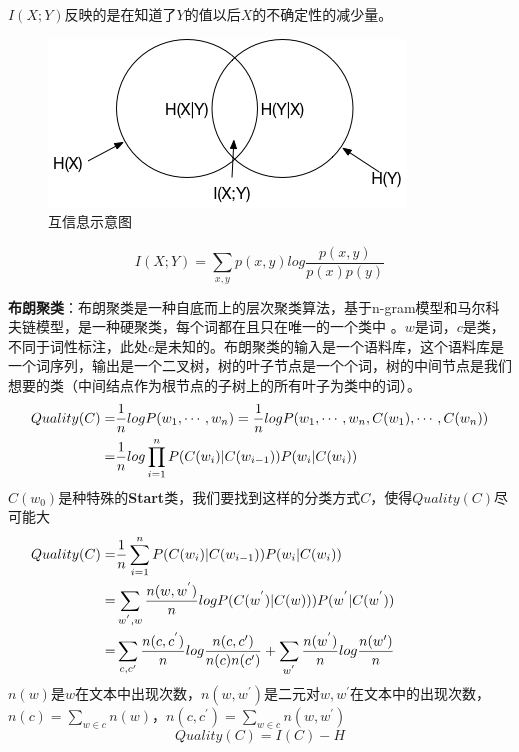\documentclass[12pt,a4paper]{article}
\begin{document}
$I(X;Y)$反映的是在知道了$Y$的值以后$X$的不确定性的减少量。
\begin{figure}
  \centering
  \includegraphics[width=0.5\linewidth]{./figures/mutualInfo.png}
  \caption{互信息示意图}\label{fig:muinfo}
\end{figure}

\begin{equation}
I(X;Y) = \sum_{x,y} p(x,y) log \frac{p(x,y)}{p(x)p(y)}
\end{equation}

\textbf{布朗聚类}：布朗聚类是一种自底而上的层次聚类算法，基于n-gram模型和马尔科夫链模型，是一种硬聚类，每个词都在且只在唯一的一个类中 \cite{derczynski2015tune,DBLP:conf/aaai/DerczynskiC16}。$w$是词，$c$是类，不同于词性标注，此处$c$是未知的。布朗聚类的输入是一个语料库，这个语料库是一个词序列，输出是一个二叉树，树的叶子节点是一个个词，树的中间节点是我们想要的类（中间结点作为根节点的子树上的所有叶子为类中的词）。
\begin{equation}
\begin{split}
Quality(C)=&\frac{1}{n}logP(w_1,\cdots,w_n) =\frac{1}{n}logP(w_1,\cdots,w_n,C(w_1),\cdots,C(w_n))\\
=&\frac{1}{n}log\prod_{i=1}^{n}P(C(w_i)|C(w_{i-1}))P(w_i|C(w_i))\hspace{1.8cm}
\end{split}
\end{equation}
$C(w_0)$是种特殊的\textbf{Start}类，我们要找到这样的分类方式$C$，使得$Quality(C)$尽可能大
\begin{equation}
\begin{split}
Quality(C)=&\frac{1}{n}\sum_{i=1}^{n}P(C(w_i)|C(w_{i-1}))P(w_i|C(w_i))\hspace{3.7cm}\\
=&\sum_{w^{'},w}\frac{n(w,w^{'})}{n}logP(C(w^{'})|C(w)))P(w^{'}|C(w^{'}))\\
=&\sum_{c,c{'}}\frac{n(c,c^{'})}{n}log\frac{n(c,c{'})}{n(c)n(c')}+\sum_{w^{'}} \frac {n(w^{'})}{n}log\frac{n(w')}{n}
\end{split}
\end{equation}
$n(w)$是$w$在文本中出现次数，$n(w,w^{'})$是二元对$w,w^{'}$在文本中的出现次数，$n(c)=\sum_{w\in c}n(w)$，$n(c,c^{'})=\sum_{w\in c}n(w,w^{'})$		
\begin{equation}
  Quality(C) = I(C)-H
\end{equation}
\end{document}
